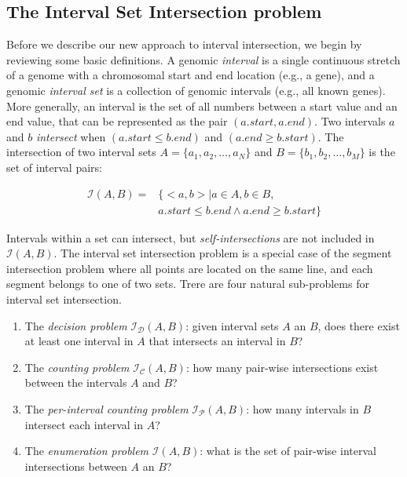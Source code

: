 \documentclass{bioinfo}
\begin{document}
\subsection{The Interval Set Intersection problem}
Before we describe our new approach to interval intersection, we begin by
reviewing some basic definitions.  A genomic \emph{interval} is a single
continuous stretch of a genome with a chromosomal start and end location (e.g.,
a gene), and a genomic \emph{interval set} is a collection of genomic intervals
(e.g., all known genes).  More generally, an interval is the set of all numbers
between a start value and an end value, that can be represented as the pair
$(a.start, a.end)$.  Two intervals $a$ and $b$ {\em intersect} when 
$(a.start \leq b.end)$ and $(a.end \geq b.start)$.  The intersection of two
interval sets $A=\{a_1, a_2, \dots, a_N\}$ and $B=\{b_1, b_2, \dots, b_M\}$ is
the set of interval pairs:

\begin{equation*}
	\begin{split}
		\mathcal{I}(A,B)= &\{ <a,b> | a \in A, b \in B, \\
		& a.start \leq b.end \wedge a.end \geq b.start\}
	\end{split}
\end{equation*}

Intervals within a set can intersect, but {\em self-intersections} are not
included in $\mathcal{I}(A,B)$.  The interval set intersection problem is a
special case of the segment intersection problem where all points are located on
the same line, and each segment belongs to one of two sets. Trere are four
natural sub-problems for interval set intersection.
\begin{enumerate}
	\item The {\em decision problem}
	$\mathcal{I_D}(A,B)$:  given interval sets $A$ an $B$, does there exist at
	least one interval in $A$ that intersects an interval in $B$?

	\item The {\em counting problem}
	$\mathcal{I_C}(A,B)$: how many pair-wise intersections exist between the
	intervals $A$ and $B$? 

	\item The {\em per-interval counting problem}
	$\mathcal{I_P}(A,B)$: how many intervals in $B$ intersect each
	interval in $A$?

	\item The {\em enumeration problem}
	$\mathcal{I}(A,B)$: what is the set of pair-wise interval intersections
	between $A$ an $B$?
\end{enumerate}
\end{document}
